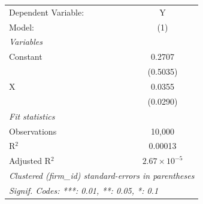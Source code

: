 
\begingroup
\centering
\begin{tabular}{lc}
   \tabularnewline \midrule \midrule
   Dependent Variable: & Y\\  
   Model:              & (1)\\  
   \midrule
   \emph{Variables}\\
   Constant            & 0.2707\\   
                       & (0.5035)\\   
   X                   & 0.0355\\   
                       & (0.0290)\\   
   \midrule
   \emph{Fit statistics}\\
   Observations        & 10,000\\  
   R$^2$               & 0.00013\\  
   Adjusted R$^2$      & $2.67\times 10^{-5}$\\   
   \midrule \midrule
   \multicolumn{2}{l}{\emph{Clustered (firm\_id) standard-errors in parentheses}}\\
   \multicolumn{2}{l}{\emph{Signif. Codes: ***: 0.01, **: 0.05, *: 0.1}}\\
\end{tabular}
\par\endgroup


